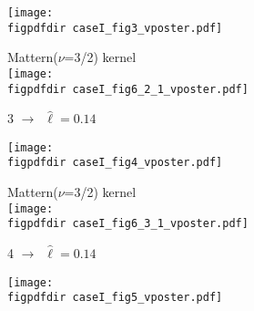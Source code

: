 \documentclass[landscape,a1,final]{a0poster} %
\def\figpdfdir{fig/} %
\begin{document}
\begin{minipage}{1\linewidth}
\begin{minipage}[t]{0.31\textwidth}
\begin{minipage}[t]{0.49\textwidth}
\begin{minipage}[t]{0.45\textwidth}
\vspace{0.3cm}
\texttt{[image: \\figpdfdir caseI\_fig3\_vposter.pdf]}

\end{minipage}
\begin{minipage}[t]{0.50\textwidth}
\vspace{-0.5cm}
\hspace{0.25\textwidth}  \tiny Mattern($\nu$=3/2) kernel\\
\texttt{[image: \\figpdfdir caseI\_fig6\_2\_1\_vposter.pdf]}

\end{minipage}

\end{minipage}


\vspace{5mm}
\begin{minipage}[t]{0.49\textwidth}

\begin{minipage}[t]{0.45\textwidth}
{\large 3}\hspace{0.7cm}  $\to$\, {\scriptsize$\hat{\ell}=0.14$}

\vspace{0.3cm}
\texttt{[image: \\figpdfdir caseI\_fig4\_vposter.pdf]}

\end{minipage}
\begin{minipage}[t]{0.50\textwidth}
\vspace{-0.5cm}
\hspace{0.25\textwidth}  \tiny Mattern($\nu$=3/2) kernel\\
\texttt{[image: \\figpdfdir caseI\_fig6\_3\_1\_vposter.pdf]}

\end{minipage}

\end{minipage}
\begin{minipage}[t]{0.49\textwidth}

\begin{minipage}[t]{0.45\textwidth}
{\large 4}\hspace{0.7cm}  $\to$\, {\scriptsize$\hat{\ell}=0.14$}

\vspace{0.3cm}
\texttt{[image: \\figpdfdir caseI\_fig5\_vposter.pdf]}


\end{minipage}
\end{minipage}
\end{minipage}
\end{minipage}
\end{document}
